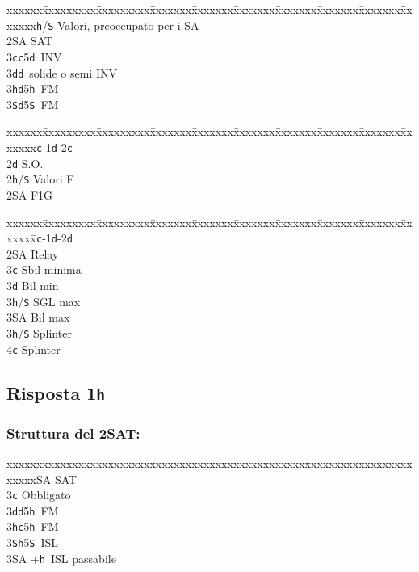 \documentclass[a4paper,italian]{article}
\newcommand{\BS}{\small{\texttt{S}}}
\newcommand{\BC}{\small{\texttt{c}}}
\newcommand{\BD}{\small{\texttt{d}}}
\newcommand{\BH}{\small{\texttt{h}}}
\newcommand{\pdfh}{\texorpdfstring{\texttt{h}}{H}}
\newenvironment{bidtable}
{\begin{tabbing}

    xxxxxx\=xxxxxxxxx\=xxxxxxxxx\=xxxxxxx\=xxxxxxx\=xxxxxxx\=xxxxxxx\=xxxxxxx\=xxxxxxx\=xxxxxxx\=\kill}
{\end{tabbing} }%
\begin{document}
\begin{multicols}{2}
\begin{bidtable}
        [2pt]2\BH/\BS \> Valori, preoccupato per i SA\\
        2\small{SA} \small{SA}T\\
        3\BC {}\BC 5\BD\ INV\\
        3\BD {}\BD\ solide o semi INV\\
        3\BH {}\BD 5\BH\ FM\\
        3\BS {}\BD 5\BS\ FM\-
    \end{bidtable}
    \bigbreak
    \begin{bidtable}
        1\BC-1\BD-2\BC\+\\
        2\BD \> S.O.\\
        2\BH/\BS \> Valori F\\
        2\small{SA} \> F1G\-
    \end{bidtable}
    \bigbreak
    \begin{bidtable}
        1\BC-1\BD-2\BD\+\\
        2\small{SA} \> Relay\+\\
        3\BC \> Sbil minima\\
        3\BD \> Bil min\\
        3\BH/\BS \> SGL max\\
        3\small{SA} \> Bil max\-\\
        3\BH/\BS \> Splinter\\
        4\BC \> Splinter\-
    \end{bidtable}

    \subsection{Risposta 1\pdfh}

    \subsubsection{Struttura del 2SAT:}

    \begin{bidtable}
        2\small{SA} \small{SA}T\+\\
        3\BC \> Obbligato\+\\
        3\BD {}\BD 5\BH\ FM\\
        3\BH {}\BC 5\BH\ FM\\
        3\BS {}\BH 5\BS\ ISL\\
        3\small{SA} +\BH\ ISL passabile\-\-
    \end{bidtable}


\end{multicols}
\end{document}
